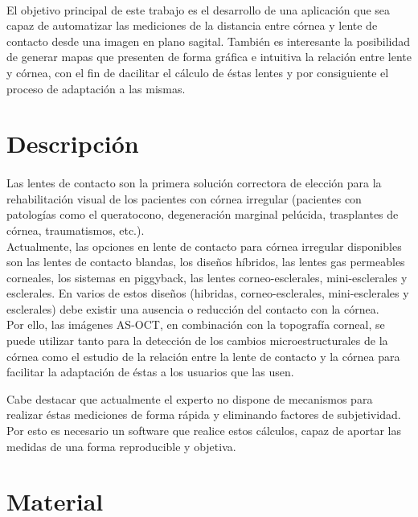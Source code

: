 \documentclass[12pt]{article}
\begin{document}
\paragraph{}
El objetivo principal de este trabajo es el desarrollo de una aplicación que sea capaz de automatizar las mediciones de la distancia entre córnea y lente de contacto desde una imagen en plano sagital. También es interesante la posibilidad de generar mapas que presenten de forma gráfica e intuitiva la relación entre lente y córnea, con el fin de dacilitar el cálculo de éstas lentes y por consiguiente el proceso de adaptación a las mismas.

\newpage
\section{Descripción}
\paragraph{}
Las lentes de contacto son la primera solución correctora de elección para la rehabilitación visual de los pacientes con córnea irregular (pacientes con patologías como el queratocono, degeneración marginal pelúcida, trasplantes de córnea, traumatismos, etc.). \\

Actualmente, las opciones en lente de contacto para córnea irregular disponibles son las lentes de contacto blandas, los diseños híbridos, las lentes gas permeables corneales, los sistemas en piggyback, las lentes corneo-esclerales, mini-esclerales y esclerales. En varios de estos diseños (hibridas, corneo-esclerales, mini-esclerales y esclerales) debe existir una ausencia o reducción del contacto con la córnea. \\

Por ello, las imágenes AS-OCT, en combinación con la topografía corneal, se puede utilizar tanto para la detección de los cambios microestructurales de la córnea como el estudio de la relación entre la lente de contacto y la córnea para facilitar la 
adaptación de éstas a los usuarios que las usen.

Cabe destacar que actualmente el experto no dispone de mecanismos para realizar éstas mediciones de forma rápida y eliminando factores de subjetividad. Por esto es necesario un software que realice estos cálculos, capaz de aportar las medidas de una forma reproducible y objetiva.

\newpage
\section{Material}
\end{document}
